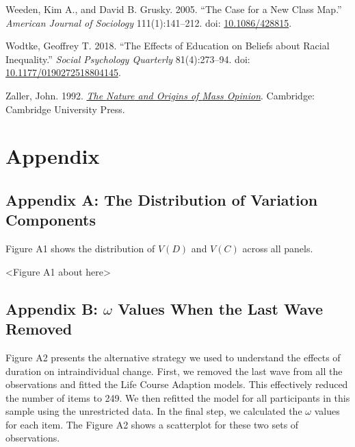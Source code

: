 \documentclass[
  12pt,
]{article}
\newlength{\cslhangindent}
\newlength{\cslentryspacingunit} %
\newenvironment{CSLReferences}[2] %
 {%
  \setlength{\parindent}{0pt}
  \ifodd #1
  \let\oldpar\par
  \def\par{\hangindent=\cslhangindent\oldpar}
  \fi
  \setlength{\parskip}{#2\cslentryspacingunit}
 }%
 {}
\begin{document}
\begin{CSLReferences}{1}{0}
\leavevmode{}%
Weeden, Kim A., and David B. Grusky. 2005. {``The {Case} for a {New}
{Class} {Map}.''} \emph{American Journal of Sociology} 111(1):141--212.
doi: \href{https://doi.org/10.1086/428815}{10.1086/428815}.

\leavevmode{}%
Wodtke, Geoffrey T. 2018. {``The {Effects} of {Education} on {Beliefs}
about {Racial} {Inequality}.''} \emph{Social Psychology Quarterly}
81(4):273--94. doi:
\href{https://doi.org/10.1177/0190272518804145}{10.1177/0190272518804145}.

\leavevmode{}%
Zaller, John. 1992.
\emph{\href{https://doi.org/10.1017/CBO9780511818691}{The {Nature} and
{Origins} of {Mass} {Opinion}}}. Cambridge: Cambridge University Press.

\end{CSLReferences}

\newpage

\hypertarget{appendix}{%
\section{Appendix}\label{appendix}}

\hypertarget{appendix-a-the-distribution-of-variation-components}{%
\subsection{Appendix A: The Distribution of Variation
Components}\label{appendix-a-the-distribution-of-variation-components}}

Figure A1 shows the distribution of \(V(D)\) and \(V(C)\) across all
panels.

\begin{center}
<Figure A1 about here>
\end{center}

\hypertarget{appendix-b-omega-values-when-the-last-wave-removed}{%
\subsection{\texorpdfstring{Appendix B: \(\omega\) Values When the Last
Wave
Removed}{Appendix B: \textbackslash omega Values When the Last Wave Removed}}\label{appendix-b-omega-values-when-the-last-wave-removed}}

Figure A2 presents the alternative strategy we used to understand the
effects of duration on intraindividual change. First, we removed the
last wave from all the observations and fitted the Life Course Adaption
models. This effectively reduced the number of items to 249. We then
refitted the model for all participants in this sample using the
unrestricted data. In the final step, we calculated the \(\omega\)
values for each item. The Figure A2 shows a scatterplot for these two
sets of observations.
\end{document}
